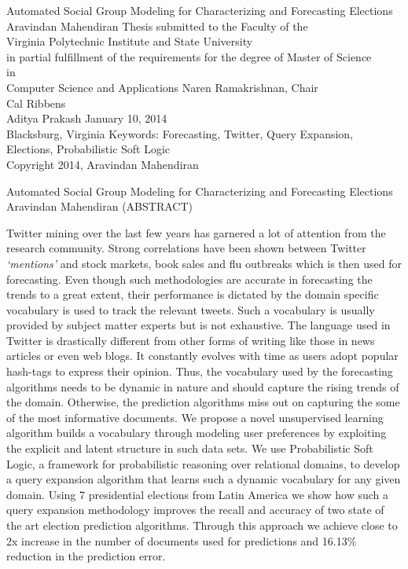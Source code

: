 \documentclass[12pt]{report}
\begin{document}
\thispagestyle{empty}

\begin{center}
{\Large 
Automated Social Group Modeling for Characterizing and Forecasting Elections
}
\vfill
Aravindan Mahendiran
\vfill
Thesis submitted to the Faculty of the \\
Virginia Polytechnic Institute and State University \\
in partial fulfillment of the requirements for the degree of
\vfill
Master of Science \\
in \\
Computer Science and Applications
\vfill
Naren Ramakrishnan, Chair \\
Cal Ribbens \\
Aditya Prakash
\vfill
January 10, 2014 \\
Blacksburg, Virginia
\vfill
Keywords: Forecasting, Twitter, Query Expansion, Elections, Probabilistic Soft Logic \\
Copyright 2014, Aravindan Mahendiran
\end{center}
\pagebreak
\thispagestyle{empty}

\begin{center}
{\large Automated Social Group Modeling for Characterizing and Forecasting Elections}
\vfill
Aravindan Mahendiran
\vfill
(ABSTRACT)
\vfill
\end{center}
Twitter mining over the last few years has garnered a lot of attention from the research community. 
Strong correlations have been shown between Twitter \emph{‘mentions’} and stock markets, book sales and flu outbreaks which is then used for forecasting.
Even though such methodologies are accurate in forecasting the trends to a great extent, their performance is dictated by the domain specific vocabulary is used to track the relevant tweets. 
Such a vocabulary is usually provided by subject matter experts but is not exhaustive.
The language used in Twitter is drastically different from other forms of writing like those in news articles or even web blogs.  
It constantly evolves with time as users adopt popular hash-tags to express their opinion.
Thus, the vocabulary used by the forecasting algorithms needs to be dynamic in nature and should capture the rising trends of the domain. 
Otherwise, the prediction algorithms miss out on capturing the some of the most informative documents.
\newline 
We propose a novel unsupervised learning algorithm builds a vocabulary through modeling user preferences by exploiting the explicit and latent structure in such data sets.
We use Probabilistic Soft Logic, a framework for probabilistic reasoning over relational domains, to develop a query expansion algorithm that learns such a dynamic vocabulary for any given domain.  
Using 7 presidential elections from Latin America we show how such a query expansion methodology improves the recall and accuracy of two state of the art election prediction algorithms. 
Through this approach we achieve close to 2x increase in the number of documents used for predictions and 16.13\% reduction in the prediction error. 
\pagebreak
\end{document}
